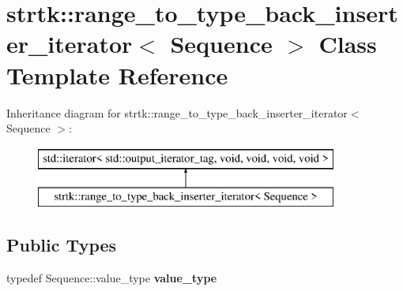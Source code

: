 \hypertarget{classstrtk_1_1range__to__type__back__inserter__iterator}{\section{strtk\-:\-:range\-\_\-to\-\_\-type\-\_\-back\-\_\-inserter\-\_\-iterator$<$ Sequence $>$ Class Template Reference}
\label{classstrtk_1_1range__to__type__back__inserter__iterator}
}
Inheritance diagram for strtk\-:\-:range\-\_\-to\-\_\-type\-\_\-back\-\_\-inserter\-\_\-iterator$<$ Sequence $>$\-:\begin{figure}[H]
\begin{center}
\leavevmode
\includegraphics[height=2.000000cm]{classstrtk_1_1range__to__type__back__inserter__iterator}
\end{center}
\end{figure}
\subsection*{Public Types}
\begin{DoxyCompactItemize}
\item 
\hypertarget{classstrtk_1_1range__to__type__back__inserter__iterator_a9a297d1f94cc4e0862c0690c6972eb3a}{typedef Sequence\-::value\-\_\-type {\bfseries value\-\_\-type}}\label{classstrtk_1_1range__to__type__back__inserter__iterator_a9a297d1f94cc4e0862c0690c6972eb3a}

\end{DoxyCompactItemize}
